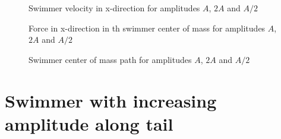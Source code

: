 \begin{figure}[H]
\centering
  \begin{footnotesize}
  
  \caption[Swimmer velocity in x-direction for amplitudes $A$, $2A$ and $A/2$ ]{Swimmer velocity in x-direction for amplitudes $A$, $2A$ and $A/2$ }
   \label{fig:Bild4.9}
  \end{footnotesize}
\end{figure} 

\begin{figure}[H]
\centering
  \begin{footnotesize}
  
  \caption[Force in x-direction in th swimmer center of mass for amplitudes $A$, $2A$ and $A/2$]{Force in x-direction in th swimmer center of mass for amplitudes $A$, $2A$ and $A/2$}
   \label{fig:Bild4.10}
  \end{footnotesize}
\end{figure} 

\begin{figure}[H]
\centering
  \begin{footnotesize}
  
  \caption[Swimmer center of mass path for amplitudes $A$, $2A$ and $A/2$]{Swimmer center of mass path for amplitudes $A$, $2A$ and $A/2$}
   \label{fig:Bild4.11}
  \end{footnotesize}
\end{figure}


\section{Swimmer with increasing amplitude along tail}
\label{sec:section }


















